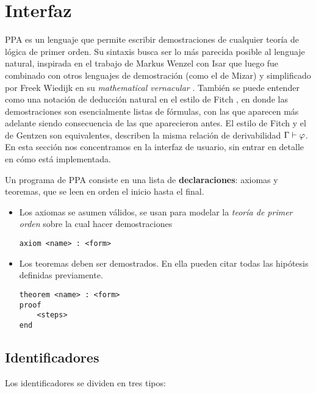 \section{Interfaz}

PPA es un lenguaje que permite escribir demostraciones de cualquier teoría de
lógica de primer orden. Su sintaxis busca ser lo más parecida posible al
lenguaje natural, inspirada en el trabajo de Markus Wenzel con Isar
\cite{wenzel-isar} que luego fue combinado con otros lenguajes de demostración
(como el de Mizar) y simplificado por Freek Wiedijk en su \textit{mathematical
vernacular} \cite{freek-mv}. También se puede entender como una notación de
deducción natural en el estilo de Fitch \cite{sep-natural-deduction}, en donde
las demostraciones son esencialmente listas de fórmulas, con las que aparecen
más adelante siendo consecuencia de las que aparecieron antes. El estilo de
Fitch y el de Gentzen son equivalentes, describen la misma relación de
derivabilidad $\Gamma \vdash \varphi$. En esta sección nos
concentramos en la interfaz de usuario, sin entrar en detalle en cómo está
implementada.

Un programa de PPA consiste en una lista de \textbf{declaraciones}: axiomas y
teoremas, que se leen en orden el inicio hasta el final.

\begin{itemize}
    \item Los axiomas se asumen válidos, se usan para modelar la \textit{teoría
    de primer orden} sobre la cual hacer demostraciones

    \begin{lstlisting}[numbers=none]
axiom <name> : <form>
    \end{lstlisting}

    \item Los teoremas deben ser demostrados. En ella pueden citar
    todas las hipótesis definidas previamente.

    \begin{lstlisting}[numbers=none]
theorem <name> : <form>
proof
    <steps>
end
    \end{lstlisting}
\end{itemize}

\subsection{Identificadores}

Los identificadores se dividen en tres tipos:

